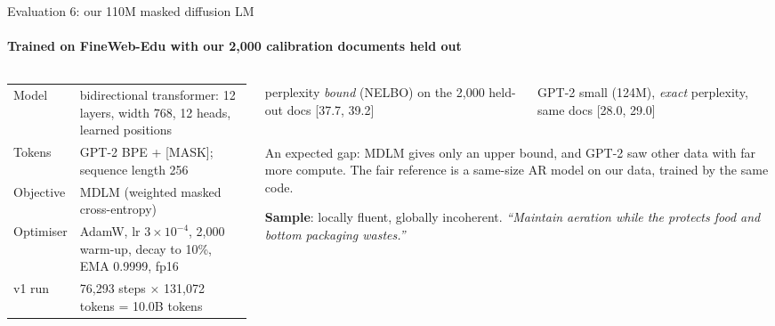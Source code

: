 \documentclass[aspectratio=169,10pt,t]{beamer}
\newcommand{\ci}[1]{{\color{ink2}\scriptsize[#1]}}
\newcommand{\stat}[2]{%
  \begin{minipage}[t]{\linewidth}\raggedright
    {\fontsize{21}{23}\selectfont\firasemibold #1}\par\vspace{1.2mm}
    {\footnotesize\color{ink2}#2}
  \end{minipage}}
\begin{document}
\begin{frame}{Evaluation 6: our 110M masked diffusion LM}
  \framesubtitle{Trained on FineWeb-Edu with our 2,000 calibration documents held out}
  \vspace{1.5mm}
  \begin{columns}[T,onlytextwidth]
    \begin{column}{0.43\textwidth}
      \footnotesize
      \renewcommand{\arraystretch}{1.08}
      \begin{tabularx}{\linewidth}{@{}l L@{}}
        \toprule
        Model     & bidirectional transformer: 12 layers, width 768, 12 heads, learned positions \\
        Tokens    & GPT-2 BPE + [MASK]; sequence length 256 \\
        Objective & MDLM (weighted masked cross-entropy) \\
        Optimiser & AdamW, lr $3{\times}10^{-4}$, 2,000 warm-up, decay to 10\%, EMA 0.9999, fp16 \\
        v1 run    & 76,293 steps × 131,072 tokens = 10.0B tokens \\
        \bottomrule
      \end{tabularx}
    \end{column}
    \begin{column}{0.54\textwidth}
      \begin{columns}[T,onlytextwidth]
        \begin{column}{0.48\textwidth}
          \begin{panel}[colback=wash, colframe=wash, height=22mm]
            \stat{38.4}{perplexity \emph{bound} (NELBO) on the 2,000 held-out docs
              \ci{37.7, 39.2}}
          \end{panel}
        \end{column}
        \begin{column}{0.48\textwidth}
          \begin{panel}[height=22mm]
            \stat{28.5}{GPT-2 small (124M), \emph{exact} perplexity, same docs
              \ci{28.0, 29.0}}
          \end{panel}
        \end{column}
      \end{columns}
      \vspace{1.5mm}
      {\footnotesize\raggedright An expected gap: MDLM gives only an upper bound, and GPT-2
      saw other data with far more compute. The fair reference is a same-size AR model on our
      data, trained by the same code.\par}
      \vspace{1.5mm}
      {\footnotesize\raggedright\textbf{Sample}: locally fluent, globally incoherent.
      {\color{ink2}\itshape ``Maintain aeration while the protects food and bottom
      packaging wastes.''}\par}
    \end{column}
  \end{columns}
\end{frame}
\end{document}
